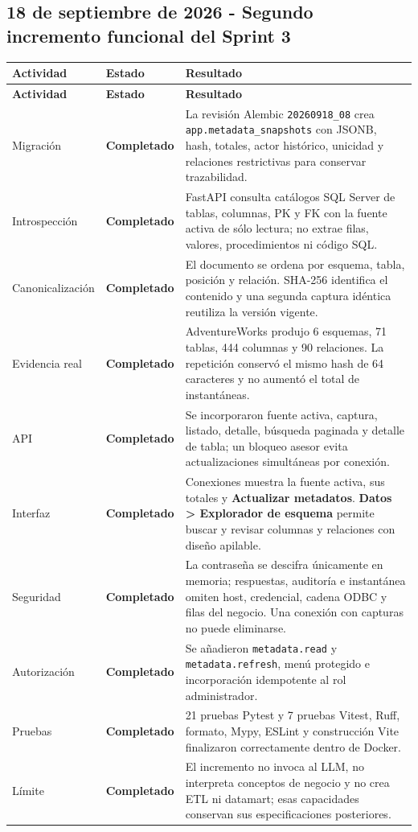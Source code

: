 \documentclass[11pt,letterpaper]{article}
\newcommand{\statusok}{\textcolor{deepgreen}{\textbf{Completado}}}
\newcommand{\file}[1]{\texttt{#1}}
\begin{document}
\subsection{18 de septiembre de 2026 - Segundo incremento funcional del Sprint 3}

\begin{longtable}{@{}p{}p{}p{}@{}}
  \toprule
  \textbf{Actividad} & \textbf{Estado} & \textbf{Resultado} \\
  \midrule
  \endfirsthead
  \toprule
  \textbf{Actividad} & \textbf{Estado} & \textbf{Resultado} \\
  \midrule
  \endhead
  Migración & \statusok & La revisión Alembic \file{20260918\_08} crea \file{app.metadata\_snapshots} con JSONB, hash, totales, actor histórico, unicidad y relaciones restrictivas para conservar trazabilidad. \\
  Introspección & \statusok & FastAPI consulta catálogos SQL Server de tablas, columnas, PK y FK con la fuente activa de sólo lectura; no extrae filas, valores, procedimientos ni código SQL. \\
  Canonicalización & \statusok & El documento se ordena por esquema, tabla, posición y relación. SHA-256 identifica el contenido y una segunda captura idéntica reutiliza la versión vigente. \\
  Evidencia real & \statusok & AdventureWorks produjo 6 esquemas, 71 tablas, 444 columnas y 90 relaciones. La repetición conservó el mismo hash de 64 caracteres y no aumentó el total de instantáneas. \\
  API & \statusok & Se incorporaron fuente activa, captura, listado, detalle, búsqueda paginada y detalle de tabla; un bloqueo asesor evita actualizaciones simultáneas por conexión. \\
  Interfaz & \statusok & Conexiones muestra la fuente activa, sus totales y \textbf{Actualizar metadatos}. \textbf{Datos > Explorador de esquema} permite buscar y revisar columnas y relaciones con diseño apilable. \\
  Seguridad & \statusok & La contraseña se descifra únicamente en memoria; respuestas, auditoría e instantánea omiten host, credencial, cadena ODBC y filas del negocio. Una conexión con capturas no puede eliminarse. \\
  Autorización & \statusok & Se añadieron \file{metadata.read} y \file{metadata.refresh}, menú protegido e incorporación idempotente al rol administrador. \\
  Pruebas & \statusok & 21 pruebas Pytest y 7 pruebas Vitest, Ruff, formato, Mypy, ESLint y construcción Vite finalizaron correctamente dentro de Docker. \\
  Límite & \statusok & El incremento no invoca al LLM, no interpreta conceptos de negocio y no crea ETL ni datamart; esas capacidades conservan sus especificaciones posteriores. \\
  \bottomrule
\end{longtable}
\end{document}
